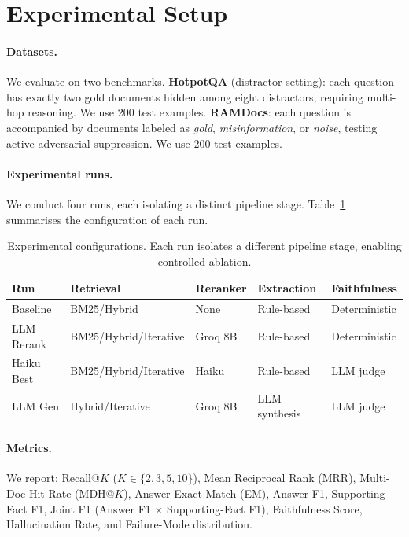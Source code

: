 \documentclass{article}
\begin{document}
\section{Experimental Setup}
\label{sec:experiments}

\paragraph{Datasets.}
We evaluate on two benchmarks.  \textbf{HotpotQA} \citep{yang2018hotpotqa}
(distractor setting): each question has exactly two gold documents hidden
among eight distractors, requiring multi-hop reasoning.  We use 200 test
examples.  \textbf{RAMDocs}: each question is accompanied by documents
labeled as \textit{gold}, \textit{misinformation}, or \textit{noise},
testing active adversarial suppression.  We use 200 test examples.

\paragraph{Experimental runs.}
We conduct four runs, each isolating a distinct pipeline stage.
Table~\ref{tab:runs} summarises the configuration of each run.

\begin{table}[h]
  \caption{Experimental configurations. Each run isolates a different
           pipeline stage, enabling controlled ablation.}
  \label{tab:runs}
  \centering
  \small
  \begin{tabular}{lllll}
    \toprule
    Run & Retrieval & Reranker & Extraction & Faithfulness \\
    \midrule
    Baseline   & BM25/Hybrid & None & Rule-based & Deterministic \\
    LLM Rerank & BM25/Hybrid/Iterative & Groq 8B & Rule-based & Deterministic \\
    Haiku Best & BM25/Hybrid/Iterative & Haiku & Rule-based & LLM judge \\
    LLM Gen    & Hybrid/Iterative & Groq 8B & LLM synthesis & LLM judge \\
    \bottomrule
  \end{tabular}
\end{table}

\paragraph{Metrics.}
We report: Recall@$K$ ($K \in \{2,3,5,10\}$), Mean Reciprocal Rank
(MRR), Multi-Doc Hit Rate (MDH@$K$), Answer Exact Match (EM), Answer
F1, Supporting-Fact F1, Joint F1 (Answer F1 $\times$ Supporting-Fact
F1), Faithfulness Score, Hallucination Rate, and Failure-Mode
distribution.
\end{document}
